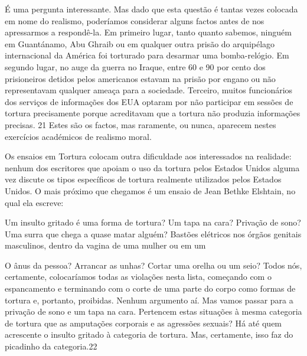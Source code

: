  \par 
É uma pergunta interessante. Mas dado que esta questão é tantas vezes colocada em nome do realismo, poderíamos considerar alguns factos antes de nos apressarmos a respondê-la. Em primeiro lugar, tanto quanto sabemos, ninguém em Guantánamo, Abu Ghraib ou em qualquer outra prisão do arquipélago internacional da América foi torturado para desarmar uma bomba-relógio. Em segundo lugar, no auge da guerra no Iraque, entre {\color{blue}60} e {\color{blue}90} por cento dos prisioneiros detidos pelos americanos estavam na prisão por engano ou não representavam qualquer ameaça para a sociedade. Terceiro, muitos funcionários dos serviços de informações dos EUA optaram por não participar em sessões de tortura precisamente porque acreditavam que a tortura não produzia informações precisas. {\color{blue}21} Estes são os factos, mas raramente, ou nunca, aparecem nestes exercícios académicos de realismo moral.
 \par 
Os ensaios em Tortura colocam outra dificuldade aos interessados ​​na realidade: nenhum dos escritores que apoiam o uso da tortura pelos Estados Unidos alguma vez discute os tipos específicos de tortura realmente utilizados pelos Estados Unidos. O mais próximo que chegamos é um ensaio de Jean Bethke Elshtain, no qual ela escreve:
 \par 
Um insulto gritado é uma forma de tortura? Um tapa na cara? Privação de sono? Uma surra que chega a quase matar alguém? Bastões elétricos nos órgãos genitais masculinos, dentro da vagina de uma mulher ou em um
 \par 
O ânus da pessoa? Arrancar as unhas? Cortar uma orelha ou um seio? Todos nós, certamente, colocaríamos todas as violações nesta lista, começando com o espancamento e terminando com o corte de uma parte do corpo como formas de tortura e, portanto, proibidas. Nenhum argumento aí. Mas vamos passar para a privação de sono e um tapa na cara. Pertencem estas situações à mesma categoria de tortura que as amputações corporais e as agressões sexuais? Há até quem acrescente o insulto gritado à categoria de tortura. Mas, certamente, isso faz do picadinho da categoria.{\color{blue}22}
 \par 
